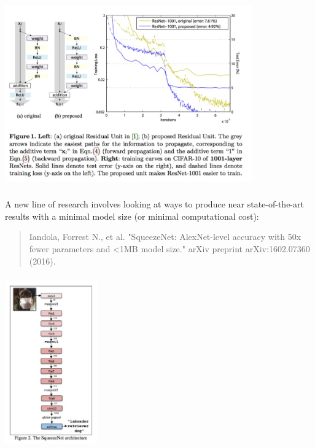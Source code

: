 \documentclass[xetex,mathserif,serif,aspectratio=169]{beamer}
\begin{document}
\begin{frame}[fragile] \frametitle{} \oldB \small

\begin{center}
\includegraphics[width=0.8\textwidth]{img/resNet1001.jpg}
\end{center}

\end{frame}

\begin{frame}[fragile] \frametitle{} \oldB \small


A new line of research involves looking at ways to produce near
state-of-the-art results with a minimal model size (or minimal
computational cost):
\begin{quote}
Iandola, Forrest N., et al. "SqueezeNet: AlexNet-level accuracy with
50x fewer parameters and <1MB model size." arXiv preprint arXiv:1602.07360 (2016).
\end{quote}

\end{frame}

\begin{frame}[fragile] \frametitle{} \oldB \small

\begin{center}
\includegraphics[width=0.3\textwidth]{img/squeezeNetModel.jpg}
\end{center}

\end{frame}
\end{document}
